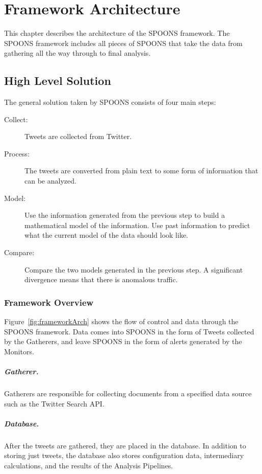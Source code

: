 \documentclass[12pt]{ucthesis}
\begin{document}
\chapter{Framework Architecture}
\label{arch-framework}
This chapter describes the architecture of the SPOONS framework. The SPOONS framework includes all pieces of SPOONS
that take the data from gathering all the way through to final analysis.

\section{High Level Solution}
\label{arch-framework-highlevel}
The general solution taken by SPOONS consists of four main steps:

\begin{description}
   \item[Collect:]
      Tweets are collected from Twitter.
   \item[Process:]
      The tweets are converted from plain text to some form of information that can be analyzed.
   \item[Model:]
      Use the information generated from the previous step to build a mathematical model of the information.
      Use past information to predict what the current model of the data should look like.
   \item[Compare:]
      Compare the two models generated in the previous step. A significant divergence means that there is
      anomalous traffic.
\end{description}

\subsection{Framework Overview}
\label{arch-framework-highlevel-overview}

Figure~\ref{fig:frameworkArch} shows the flow of control and data through the SPOONS framework. Data comes into SPOONS
in the form of Tweets collected by the Gatherers, and leave SPOONS in the form of alerts generated by the Monitors.

\paragraph{Gatherer.}
Gatherers are responsible for collecting documents from a specified data source such as the Twitter Search API.

\paragraph{Database.}
After the tweets are gathered, they are placed in the database. In addition to storing just tweets, the database also stores
configuration data, intermediary calculations, and the results of the Analysis Pipelines.
\end{document}
